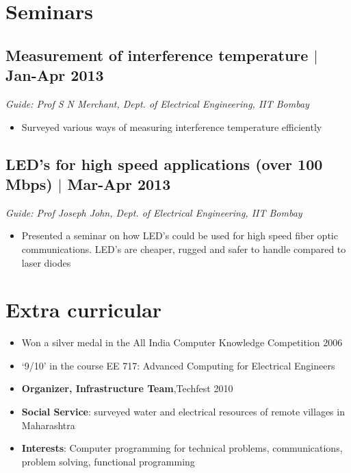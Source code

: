 \documentclass[11pt]{article}
\begin{document}
\section*{Seminars}

\subsection*{Measurement of interference temperature $\vert$  Jan-Apr 2013} 
\emph{Guide: Prof S N Merchant, Dept. of Electrical Engineering, IIT Bombay}
\begin{itemize}  
\item Surveyed various ways of measuring interference temperature efficiently 
\end{itemize}
  
\subsection*{LED's for high speed applications (over 100 Mbps) $\vert$  Mar-Apr 2013}
\emph{Guide: Prof Joseph John, Dept. of Electrical Engineering, IIT Bombay}  
\begin{itemize}  
\item Presented a seminar on how LED's could be used for high speed fiber optic communications. LED's are cheaper, rugged and safer to handle compared to laser diodes 
\end{itemize}



\section*{Extra curricular}

\begin{itemize}
\item Won a silver medal in the All India Computer Knowledge Competition 2006 
\item `9/10' in the course EE 717: Advanced Computing for Electrical Engineers 
\item \textbf{Organizer, Infrastructure Team},Techfest 2010 
\item \textbf{Social Service}: surveyed water and electrical resources of remote villages in Maharashtra 
\item \textbf{Interests}:  Computer programming for technical problems, communications, problem solving, functional programming 
\end{itemize}
\end{document}
